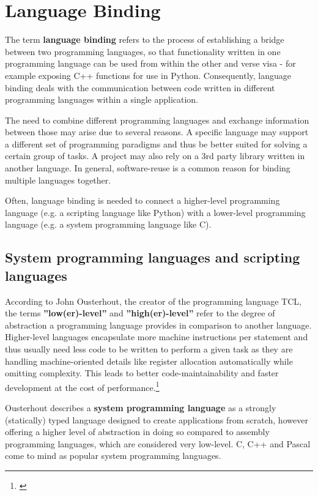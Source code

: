 \chapter{Language Binding}
\label{chap:LanguageBinding}

The term \textbf{language binding} refers to the process of establishing a bridge between two programming languages, so that functionality written in one programming language can be used from within the other and verse visa - for example exposing C++ functions for use in Python. Consequently, language binding deals with the communication between code written in different programming languages within a single application.

The need to combine different programming languages and exchange information between those may arise due to several reasons. A specific language may support a different set of programming paradigms and thus be better suited for solving a certain group of tasks. A project may also rely on a 3rd party library written in another language. In general, software-reuse is a common reason for binding multiple languages together.

Often, language binding is needed to connect a higher-level programming language (e.g. a scripting language like Python) with a lower-level programming language (e.g. a system programming language like C).

\section{System programming languages and scripting languages}

According to John Ousterhout, the creator of the programming language TCL, the terms \textbf{''low(er)-level''} and \textbf{''high(er)-level''} refer to the degree of abstraction a programming language provides in comparison to another language. Higher-level languages encapsulate more machine instructions per statement and thus usually need less code to be written to perform a given task as they are handling machine-oriented details like register allocation automatically while omitting complexity. This leads to better code-maintainability and faster development at the cost of performance.\footnote{\citep{Ousterhout}}

Ousterhout describes a \textbf{system programming language} as a strongly (statically) typed language designed to create applications from scratch, however offering a higher level of abstraction in doing so compared to assembly programming languages, which are considered very low-level. C, C++ and Pascal come to mind as popular system programming languages.

